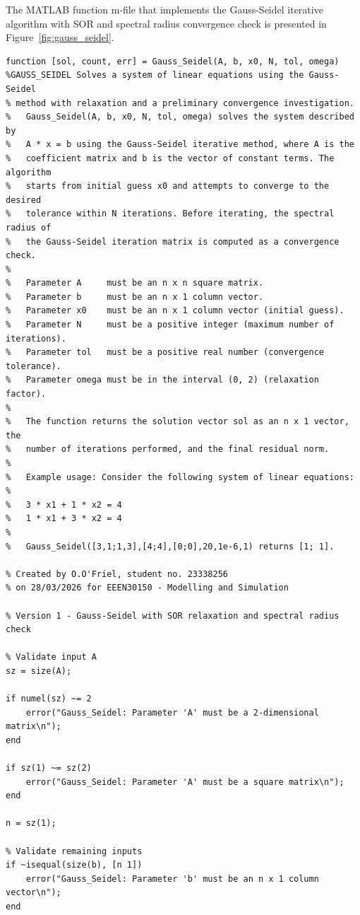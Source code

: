 \documentclass[12pt,a4paper]{article}
\begin{document}
The MATLAB function m-file that implements the Gauss-Seidel iterative algorithm with SOR
and spectral radius convergence check is presented in Figure~\ref{fig:gauss_seidel}.

\begin{lstlisting}[caption={MATLAB function m-file \texttt{Gauss\_Seidel.m} implementing the
         Gauss-Seidel iterative method with SOR relaxation and a preliminary spectral
         radius convergence check.}, label=fig:gauss_seidel]
function [sol, count, err] = Gauss_Seidel(A, b, x0, N, tol, omega)
%GAUSS_SEIDEL Solves a system of linear equations using the Gauss-Seidel
% method with relaxation and a preliminary convergence investigation.
%   Gauss_Seidel(A, b, x0, N, tol, omega) solves the system described by
%   A * x = b using the Gauss-Seidel iterative method, where A is the
%   coefficient matrix and b is the vector of constant terms. The algorithm
%   starts from initial guess x0 and attempts to converge to the desired
%   tolerance within N iterations. Before iterating, the spectral radius of
%   the Gauss-Seidel iteration matrix is computed as a convergence check.
%
%   Parameter A     must be an n x n square matrix.
%   Parameter b     must be an n x 1 column vector.
%   Parameter x0    must be an n x 1 column vector (initial guess).
%   Parameter N     must be a positive integer (maximum number of iterations).
%   Parameter tol   must be a positive real number (convergence tolerance).
%   Parameter omega must be in the interval (0, 2) (relaxation factor).
%
%   The function returns the solution vector sol as an n x 1 vector, the
%   number of iterations performed, and the final residual norm.
%
%   Example usage: Consider the following system of linear equations:
%
%   3 * x1 + 1 * x2 = 4
%   1 * x1 + 3 * x2 = 4
%
%   Gauss_Seidel([3,1;1,3],[4;4],[0;0],20,1e-6,1) returns [1; 1].

% Created by O.O'Friel, student no. 23338256
% on 28/03/2026 for EEEN30150 - Modelling and Simulation

% Version 1 - Gauss-Seidel with SOR relaxation and spectral radius check

% Validate input A
sz = size(A);

if numel(sz) ~= 2
    error("Gauss_Seidel: Parameter 'A' must be a 2-dimensional matrix\n");
end

if sz(1) ~= sz(2)
    error("Gauss_Seidel: Parameter 'A' must be a square matrix\n");
end

n = sz(1);

% Validate remaining inputs
if ~isequal(size(b), [n 1])
    error("Gauss_Seidel: Parameter 'b' must be an n x 1 column vector\n");
end


\end{lstlisting}
\end{document}
